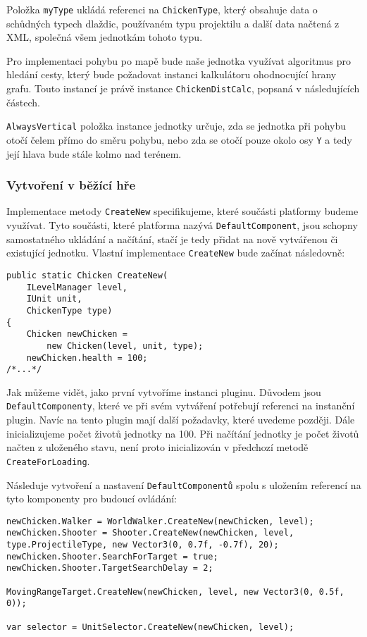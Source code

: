Položka \texttt{myType} ukládá referenci na \texttt{ChickenType}, který obsahuje data o schůdných typech dlaždic, používaném typu projektilu a další data načtená z XML, společná všem jednotkám tohoto typu.

Pro implementaci pohybu po mapě bude naše jednotka využívat algoritmus pro hledání cesty, který bude požadovat instanci kalkulátoru ohodnocující hrany grafu. Touto instancí je právě instance \texttt{ChickenDistCalc}, popsaná v následujících částech.

\texttt{AlwaysVertical} položka instance jednotky určuje, zda se jednotka při pohybu otočí čelem přímo do směru pohybu, nebo zda se otočí pouze okolo osy \texttt{Y} a tedy její hlava bude stále kolmo nad terénem.

\subsubsection{Vytvoření v běžící hře}
\label{sec:instantiation}

Implementace metody \texttt{CreateNew} specifikujeme, které součásti platformy budeme využívat. Tyto součásti, které platforma nazývá \texttt{DefaultComponent}, jsou schopny samostatného ukládání a načítání, stačí je tedy přidat na nově vytvářenou či existující jednotku. Vlastní implementace \texttt{CreateNew} bude začínat následovně: 

\begin{lstlisting}
public static Chicken CreateNew(
	ILevelManager level, 
	IUnit unit, 
	ChickenType type)
{
	Chicken newChicken = 
		new Chicken(level, unit, type);
	newChicken.health = 100;
/*...*/
\end{lstlisting}

Jak můžeme vidět, jako první vytvoříme instanci pluginu. Důvodem jsou \texttt{DefaultComponenty}, které ve při svém vytváření potřebují referenci na instanční plugin. Navíc na tento plugin mají další požadavky, které uvedeme později. Dále inicializujeme počet životů jednotky na 100. Při načítání jednotky je počet životů načten z uloženého stavu, není proto inicializován v předchozí metodě \texttt{CreateForLoading}.

Následuje vytvoření a nastavení \texttt{DefaultComponentů} spolu s uložením referencí na tyto komponenty pro budoucí ovládání:

\begin{lstlisting}
newChicken.Walker = WorldWalker.CreateNew(newChicken, level);
newChicken.Shooter = Shooter.CreateNew(newChicken, level,
type.ProjectileType, new Vector3(0, 0.7f, -0.7f), 20);
newChicken.Shooter.SearchForTarget = true;
newChicken.Shooter.TargetSearchDelay = 2;

MovingRangeTarget.CreateNew(newChicken, level, new Vector3(0, 0.5f, 0));

var selector = UnitSelector.CreateNew(newChicken, level);
\end{lstlisting}

